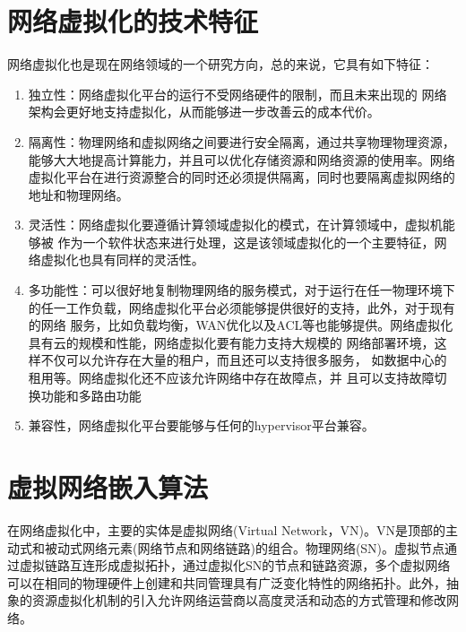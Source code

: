 



\section{网络虚拟化的技术特征}
网络虚拟化也是现在网络领域的一个研究方向，总的来说，它具有如下特征\cite{chowdhury2010survey}：
\begin{enumerate}
  \item 独立性：网络虚拟化平台的运行不受网络硬件的限制，而且未来出现的 网络架构会更好地支持虚拟化，从而能够进一步改善云的成本代价。
  \item 隔离性：物理网络和虚拟网络之间要进行安全隔离，通过共享物理物理资源，能够大大地提高计算能力，并且可以优化存储资源和网络资源的使用率。网络虚拟化平台在进行资源整合的同时还必须提供隔离，同时也要隔离虚拟网络的地址和物理网络。
  \item  灵活性：网络虚拟化要遵循计算领域虚拟化的模式，在计算领域中，虚拟机能够被 作为一个软件状态来进行处理，这是该领域虚拟化的一个主要特征，网络虚拟化也具有同样的灵活性。
  \item 多功能性：可以很好地复制物理网络的服务模式，对于运行在任一物理环境下的任一工作负载，网络虚拟化平台必须能够提供很好的支持，此外，对于现有的网络 服务，比如负载均衡，WAN优化以及ACL等也能够提供。网络虚拟化具有云的规模和性能，网络虚拟化要有能力支持大规模的 网络部署环境，这样不仅可以允许存在大量的租户，而且还可以支持很多服务， 如数据中心的租用等。网络虚拟化还不应该允许网络中存在故障点，并 且可以支持故障切换功能和多路由功能
  \item 兼容性，网络虚拟化平台要能够与任何的hypervisor平台兼容。
\end{enumerate}


\section{虚拟网络嵌入算法}
在网络虚拟化中，主要的实体是虚拟网络(Virtual Network，VN)。VN是顶部的主动式和被动式网络元素(网络节点和网络链路)的组合。物理网络(SN)。虚拟节点通过虚拟链路互连形成虚拟拓扑，通过虚拟化SN的节点和链路资源，多个虚拟网络可以在相同的物理硬件上创建和共同管理具有广泛变化特性的网络拓扑。此外，抽象的资源虚拟化机制的引入允许网络运营商以高度灵活和动态的方式管理和修改网络。

